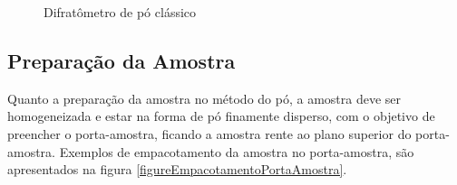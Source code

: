 \begin{figure}[ht]
    \center
    \begin{minipage}{16cm}
     \caption{Difratômetro de pó clássico}\label{figurePptDifratometroPo} 
     \end{minipage}
\end{figure}

\subsection{Preparação da Amostra}
Quanto a preparação da amostra no método do pó, a amostra deve ser
homogeneizada e estar na forma de pó finamente disperso, com o objetivo
de preencher o porta-amostra, ficando a amostra rente ao plano superior
do porta-amostra. Exemplos de empacotamento da amostra no porta-amostra,
são apresentados na figura \ref{figureEmpacotamentoPortaAmostra}.

